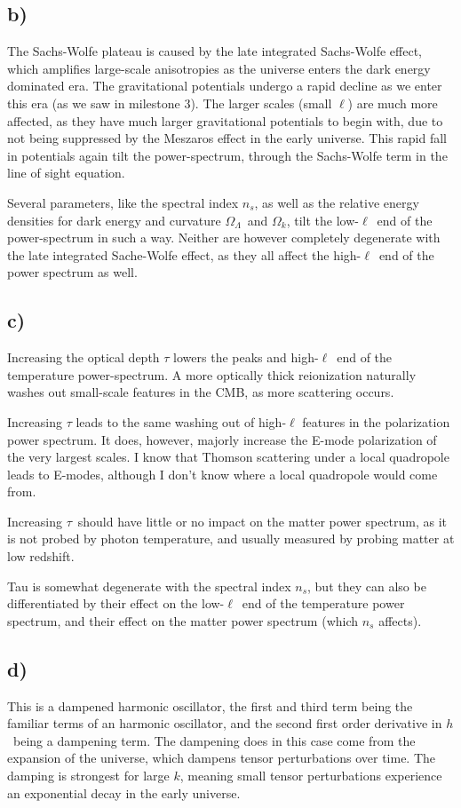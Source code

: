 \documentclass[10pt, a4paper]{article}
\begin{document}
\subsection*{b)}
The Sachs-Wolfe plateau is caused by the late integrated Sachs-Wolfe effect, which amplifies large-scale anisotropies as the universe enters the dark energy dominated era. The gravitational potentials undergo a rapid decline as we enter this era (as we saw in milestone 3). The larger scales (small $\ell$) are much more affected, as they have much larger gravitational potentials to begin with, due to not being suppressed by the Meszaros effect in the early universe. This rapid fall in potentials again tilt the power-spectrum, through the Sachs-Wolfe term in the line of sight equation.

Several parameters, like the spectral index $n_s$, as well as the relative energy densities for dark energy and curvature $\Omega_\Lambda$ and $\Omega_k$, tilt the low-$\ell$ end of the power-spectrum in such a way. Neither are however completely degenerate with the late integrated Sache-Wolfe effect, as they all affect the high-$\ell$ end of the power spectrum as well.


\subsection*{c)}
Increasing the optical depth $\tau$ lowers the peaks and high-$\ell$ end of the temperature power-spectrum. A more optically thick reionization naturally washes out small-scale features in the CMB, as more scattering occurs.

Increasing $\tau$ leads to the same washing out of high-$\ell$ features in the polarization power spectrum. It does, however, majorly increase the E-mode polarization of the very largest scales. I know that Thomson scattering under a local quadropole leads to E-modes, although I don't know where a local quadropole would come from.

Increasing $\tau$ should have little or no impact on the matter power spectrum, as it is not probed by photon temperature, and usually measured by probing matter at low redshift.

Tau is somewhat degenerate with the spectral index $n_s$, but they can also be differentiated by their effect on the low-$\ell$ end of the temperature power spectrum, and their effect on the matter power spectrum (which $n_s$ affects).


\subsection*{d)}
This is a dampened harmonic oscillator, the first and third term being the familiar terms of an harmonic oscillator, and the second first order derivative in $h$ being a dampening term. The dampening does in this case come from the expansion of the universe, which dampens tensor perturbations over time. The damping is strongest for large $k$, meaning small tensor perturbations experience an exponential decay in the early universe.
\end{document}
